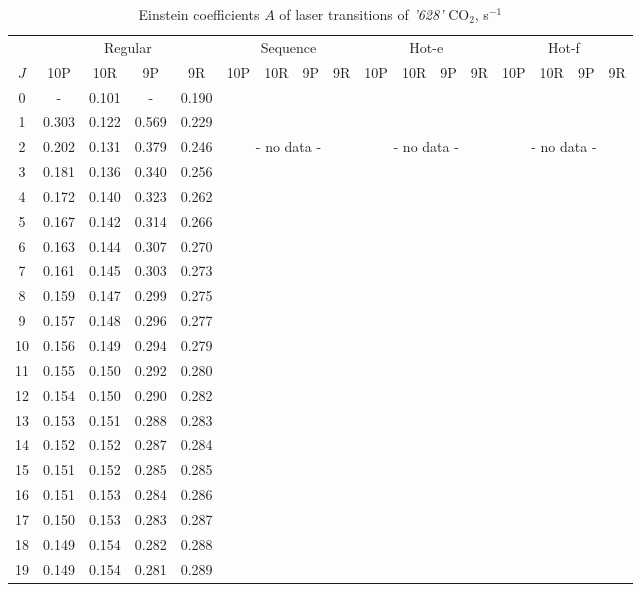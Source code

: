 \documentclass{report}
\begin{document}
\begin{appendices}
\begin{table}
\centering
\caption{Einstein coefficients $A$ of laser transitions of \textit{'628'} {CO$_2$}, s$^{-1}$}
\label{table:A628}
\scriptsize
\begin{tabular}{|c|cccc|cccc|cccc|cccc|}
\hline
& \multicolumn{4}{c|}{Regular}& \multicolumn{4}{c|}{Sequence}& \multicolumn{4}{c|}{Hot-e}& \multicolumn{4}{c|}{Hot-f}\\
$J$ & 10P & 10R & 9P & 9R & 10P & 10R & 9P & 9R & 10P & 10R & 9P & 9R & 10P & 10R & 9P & 9R\\ 
\hline
0  &   -   & 0.101 &   -   & 0.190 & & & & & & & & & & & &\\
1  & 0.303 & 0.122 & 0.569 & 0.229 & & & & & & & & & & & &\\
2  & 0.202 & 0.131 & 0.379 & 0.246 & \multicolumn{4}{c|}{- no data -}& \multicolumn{4}{c|}{- no data -}& \multicolumn{4}{c|}{- no data -}\\
3  & 0.181 & 0.136 & 0.340 & 0.256 & & & & & & & & & & & &\\
4  & 0.172 & 0.140 & 0.323 & 0.262 & & & & & & & & & & & &\\
5  & 0.167 & 0.142 & 0.314 & 0.266 & & & & & & & & & & & &\\
6  & 0.163 & 0.144 & 0.307 & 0.270 & & & & & & & & & & & &\\
7  & 0.161 & 0.145 & 0.303 & 0.273 & & & & & & & & & & & &\\
8  & 0.159 & 0.147 & 0.299 & 0.275 & & & & & & & & & & & &\\
9  & 0.157 & 0.148 & 0.296 & 0.277 & & & & & & & & & & & &\\
10 & 0.156 & 0.149 & 0.294 & 0.279 & & & & & & & & & & & &\\
11 & 0.155 & 0.150 & 0.292 & 0.280 & & & & & & & & & & & &\\
12 & 0.154 & 0.150 & 0.290 & 0.282 & & & & & & & & & & & &\\
13 & 0.153 & 0.151 & 0.288 & 0.283 & & & & & & & & & & & &\\
14 & 0.152 & 0.152 & 0.287 & 0.284 & & & & & & & & & & & &\\
15 & 0.151 & 0.152 & 0.285 & 0.285 & & & & & & & & & & & &\\
16 & 0.151 & 0.153 & 0.284 & 0.286 & & & & & & & & & & & &\\
17 & 0.150 & 0.153 & 0.283 & 0.287 & & & & & & & & & & & &\\
18 & 0.149 & 0.154 & 0.282 & 0.288 & & & & & & & & & & & &\\
19 & 0.149 & 0.154 & 0.281 & 0.289 & & & & & & & & & & & &\\

\end{tabular}
\end{table}
\end{appendices}
\end{document}
